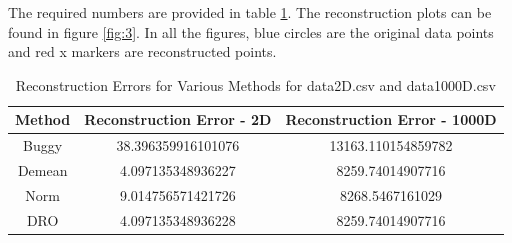 \documentclass[a4paper]{article}
\theoremstyle{definition}
\newenvironment{soln}{
    \leavevmode\color{blue}\ignorespaces
}{}
\begin{document}
\begin{itemize}
\begin{soln}
    The required numbers are provided in table \ref{tab:recerr}. The reconstruction plots can be found in figure \ref{fig:3}. In all the figures, blue circles are the original data points and red x markers are reconstructed points.
    \begin{table}[h]
        \centering
        \begin{tabular}{|c|c|c|}
            \hline
            \textbf{Method} & \textbf{Reconstruction Error - 2D} & \textbf{Reconstruction Error - 1000D} \\
            \hline
            Buggy & 38.396359916101076 & 13163.110154859782 \\
            \hline
            Demean & 4.097135348936227 & 8259.74014907716 \\
            \hline
            Norm & 9.014756571421726 & 8268.5467161029 \\
            \hline
            DRO & 4.097135348936228 & 8259.74014907716 \\
            \hline
        \end{tabular}
        \caption{Reconstruction Errors for Various Methods for \textsf{data2D.csv} and \textsf{data1000D.csv}}
        \label{tab:recerr}
    \end{table}


\end{soln}
\end{itemize}
\end{document}
